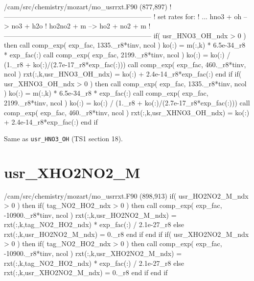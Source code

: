 \documentclass[titlepage]{article}
\begin{document}
\begin{blockcode}[commandchars=\\\{\}]
\color{gray}/cam/src/chemistry/mozart/mo_usrrxt.F90 (877,897)
!-----------------------------------------------------------------
! set rates for:
!   ... hno3 + oh --> no3 + h2o
!           ho2no2 + m --> ho2 + no2 + m
!-----------------------------------------------------------------
       if( usr_HNO3_OH_ndx > 0 ) then
          call comp_exp( exp_fac, 1335._r8*tinv, ncol )
          ko(:) = m(:,k) * 6.5e-34_r8 * exp_fac(:)
          call comp_exp( exp_fac, 2199._r8*tinv, ncol )
          ko(:) = ko(:) / (1._r8 + ko(:)/(2.7e-17_r8*exp_fac(:)))
          call comp_exp( exp_fac, 460._r8*tinv, ncol )
          rxt(:,k,usr_HNO3_OH_ndx) = ko(:) + 2.4e-14_r8*exp_fac(:)
       end if
       if( usr_XHNO3_OH_ndx > 0 ) then
          call comp_exp( exp_fac, 1335._r8*tinv, ncol )
          ko(:) = m(:,k) * 6.5e-34_r8 * exp_fac(:)
          call comp_exp( exp_fac, 2199._r8*tinv, ncol )
          ko(:) = ko(:) / (1._r8 + ko(:)/(2.7e-17_r8*exp_fac(:)))
          call comp_exp( exp_fac, 460._r8*tinv, ncol )
          rxt(:,k,usr_XHNO3_OH_ndx) = ko(:) + 2.4e-14_r8*exp_fac(:)
       end if
\end{blockcode}      

Same as \verb>usr_HNO3_OH> (TS1 section 18).


\section{usr\_XHO2NO2\_M}

\begin{blockcode}[commandchars=\\\{\}]
\color{gray}/cam/src/chemistry/mozart/mo_usrrxt.F90 (898,913)
       if( usr_HO2NO2_M_ndx > 0 ) then
          if( tag_NO2_HO2_ndx > 0 ) then
             call comp_exp( exp_fac, -10900._r8*tinv, ncol )
             rxt(:,k,usr_HO2NO2_M_ndx) = rxt(:,k,tag_NO2_HO2_ndx) * exp_fac(:) / 2.1e-27_r8
          else
             rxt(:,k,usr_HO2NO2_M_ndx) = 0._r8
          end if
       end if
       if( usr_XHO2NO2_M_ndx > 0 ) then
          if( tag_NO2_HO2_ndx > 0 ) then
             call comp_exp( exp_fac, -10900._r8*tinv, ncol )
             rxt(:,k,usr_XHO2NO2_M_ndx) = rxt(:,k,tag_NO2_HO2_ndx) * exp_fac(:) / 2.1e-27_r8
          else
             rxt(:,k,usr_XHO2NO2_M_ndx) = 0._r8
          end if
       end if
\end{blockcode}      
\end{document}
